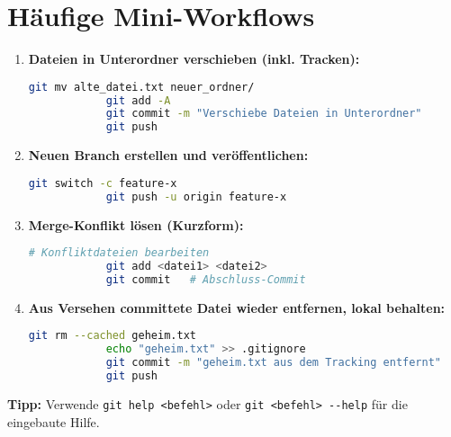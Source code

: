 \documentclass[a4paper,11pt]{article}
\begin{document}
	\section{H\"aufige Mini-Workflows}
	\begin{enumerate}
		\item \textbf{Dateien in Unterordner verschieben (inkl. Tracken):}
		\begin{lstlisting}[language=bash]
			git mv alte_datei.txt neuer_ordner/
			git add -A
			git commit -m "Verschiebe Dateien in Unterordner"
			git push
		\end{lstlisting}
		\item \textbf{Neuen Branch erstellen und ver\"offentlichen:}
		\begin{lstlisting}[language=bash]
			git switch -c feature-x
			git push -u origin feature-x
		\end{lstlisting}
		\item \textbf{Merge-Konflikt l\"osen (Kurzform):}
		\begin{lstlisting}[language=bash]
			# Konfliktdateien bearbeiten
			git add <datei1> <datei2>
			git commit   # Abschluss-Commit
		\end{lstlisting}
		\item \textbf{Aus Versehen committete Datei wieder entfernen, lokal behalten:}
		\begin{lstlisting}[language=bash]
			git rm --cached geheim.txt
			echo "geheim.txt" >> .gitignore
			git commit -m "geheim.txt aus dem Tracking entfernt"
			git push
		\end{lstlisting}
	\end{enumerate}
	
	\bigskip
	\noindent\textbf{Tipp:} Verwende \texttt{git help <befehl>} oder \texttt{git <befehl> -{}-help} f\"ur die eingebaute Hilfe.
	
\end{document}
